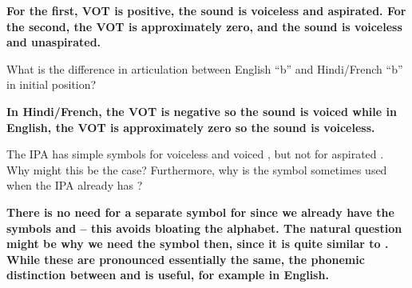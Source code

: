 \documentclass{../../templates/lkx_pset}
\begin{document}
\begin{solution}
  \bfseries 
  For the first, VOT is positive, the sound is voiceless and aspirated. For the second, the VOT is approximately zero, and the sound is voiceless and unaspirated.
\end{solution}

\begin{problem}{7}
  What is the difference in articulation between English ``b'' and Hindi/French ``b'' in initial position?
\end{problem}

\begin{solution}
  \bfseries 
  In Hindi/French, the VOT is negative so the sound is voiced while in English, the VOT is approximately zero so the sound is voiceless.
\end{solution}

\begin{problem}{8}
  The IPA has simple symbols for voiceless \textipa{[p]} and voiced \textipa{[b]}, but not for aspirated \textipa{[p\super{h}]}. Why might this be the case? Furthermore, why is the symbol \textipa{[\r*{b}]} sometimes used when the IPA already has \textipa{[p]}?
\end{problem}

\begin{solution}
  \bfseries 
  There is no need for a separate symbol for \textipa{[p\super{h}]} since we already have the symbols \textipa{[p]} and  -- this avoids bloating the alphabet. The natural question might be why we need the symbol \textipa{[p]} then, since it is quite similar to \textipa{[\r*{b}]}. While these are pronounced essentially the same, the phonemic distinction between  and  is useful, for example in English.
\end{solution}
\end{document}

